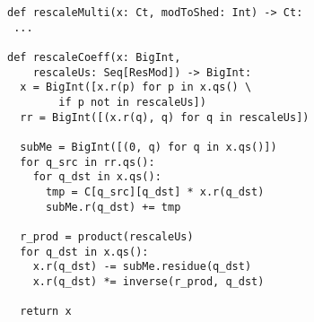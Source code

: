 \begin{figure}
\begin{lstlisting}[label=lst:rescale,caption={
  \todo{Rewrite, make self-contained} Implementation of \texttt{rescale}.
}]
def rescaleMulti(x: Ct, modToShed: Int) -> Ct:
 ...

def rescaleCoeff(x: BigInt,
    rescaleUs: Seq[ResMod]) -> BigInt:
  x = BigInt([x.r(p) for p in x.qs() \
        if p not in rescaleUs])
  rr = BigInt([(x.r(q), q) for q in rescaleUs])

  subMe = BigInt([(0, q) for q in x.qs()])
  for q_src in rr.qs():
    for q_dst in x.qs():
      tmp = C[q_src][q_dst] * x.r(q_dst)
      subMe.r(q_dst) += tmp

  r_prod = product(rescaleUs)
  for q_dst in x.qs():
    x.r(q_dst) -= subMe.residue(q_dst)
    x.r(q_dst) *= inverse(r_prod, q_dst)

  return x
\end{lstlisting}
\end{figure}
